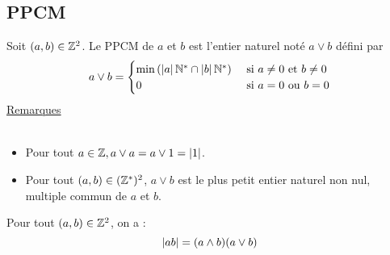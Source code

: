 \subsection{PPCM}
\begin{defi}
    Soit \((a, b) \in \mathbb{Z}^2\). Le PPCM de \(a\) et \(b\) est l’entier naturel noté \(a \vee b\) défini par
    \[a \vee b = \begin{cases}
    \min \left(\left\lvert a\right\rvert \mathbb{N}^* \cap \left\lvert b\right\rvert \mathbb{N}^*\right) &\text{ si } a\neq 0\text{ et }b \neq 0 \\
    0 &\text{ si } a = 0 \text{ ou } b = 0 
    \end{cases}
    \]
    \underline{Remarques}\\~\\
        \begin{itemize}
            \item Pour tout \(a \in \mathbb{Z}, a \vee a = a \vee 1 = \left\lvert1\right\rvert\).
            \item Pour tout \((a, b) \in (\mathbb{Z}^*)^2\), \(a \vee b\) est le plus petit entier naturel non nul, multiple commun de \(a\) et \(b\).
        \end{itemize}
\end{defi}

\begin{prop}
    Pour tout \((a, b) \in \mathbb{Z}^2\), on a :
    \[\left\lvert ab\right\rvert = (a \wedge b) (a \vee b)\]  
\end{prop}

